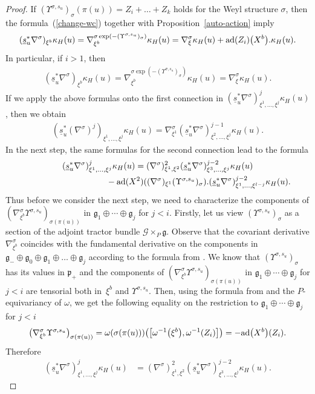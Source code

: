 \documentclass[10pt,a4paper]{amsart}
\newcommand{\om}{\omega}
\newcommand{\ka}{\kappa}
\newcommand{\si}{\sigma}
\newcommand{\un}{\underline}
\newcommand{\ba}{\mathcal{G}}
\newcommand{\fg}{\mathfrak g}
\newcommand{\fp}{\mathfrak p}
\newcommand{\na}{\nabla}
\newcommand{\U}{\Upsilon}
\newcommand{\ad}{{\rm ad}}
\numberwithin{equation}{section}
\begin{document}
\begin{proof}
If $(\U^{\si,s_u})_\si(\pi(u))=Z_i+\dots+Z_k$ holds for the Weyl structure $\si$, then the formula~(\ref{change-wc}) together with Proposition~\ref{auto-action} imply
\begin{gather*}(\un s_u^*\na^\si)_{\xi^b}\ka_H(u)=\na^{\si \exp(-(\U^{\si,s_u})_\si)}_{\xi^b}\ka_H(u)=\na^\si_\xi \ka_H(u)+\ad(Z_i)\big(X^{b}\big).\ka_H(u).\end{gather*}
In particular, if $i>1$, then
\begin{gather*}(\un s_u^*\na^\si)_{\xi^b}\ka_H(u)=\na^{\si \exp(-(\U^{\si,s_u})_\si)}_{\xi^b}\ka_H(u)=\na^\si_\xi \ka_H(u).\end{gather*}
If we apply the above formulas onto the f\/irst connection in $(\un s_u^*\nabla^\si)^j_{\xi^1,\dots,\xi^j} \ka_H(u)$, then we obtain
\begin{gather*}
(\un s_u^*(\nabla^\si)^j)_{\xi^1,\dots,\xi^j} \ka_H(u) =\na^\si_{\xi^1}(\un s_u^*\nabla^\si)^{j-1}_{\xi^2,\dots,\xi^{j}} \ka_H(u).
\end{gather*}
In the next step, the same formulas for the second connection lead to the formula
\begin{gather*}
(\un s_u^*\nabla^\si)^j_{\xi^1,\dots,\xi^j} \ka_H(u) =(\na^\si)^2_{\xi^1,\xi^2}(\un s_u^*\nabla^\si)^{j-2}_{\xi^3,\dots,\xi^{j}} \ka_H(u)\\
\hphantom{(\un s_u^*\nabla^\si)^j_{\xi^1,\dots,\xi^j} \ka_H(u) =}{}
-\ad(X^{2})((\nabla^\si)_{\xi^1}(\U^{\si,s_u})_\si).(\un s_u^*\nabla^\si)^{j-2}_{\xi^1,\dots,\xi^{l-j}}\ka_H(u).
\end{gather*}
Thus before we consider the next step, we need to characterize the components of $(\na^\si_{\xi^b}\! \U^{\si,s_u}\!)_{\si(\pi(u))\!}\!$ in $\fg_1\oplus \cdots \oplus \fg_{j}$ for $j<i$. Firstly, let us view $(\U^{\si,s_u})_\si$ as a section of the adjoint tractor bundle $\ba\times_P \fg$. Observe that the covariant derivative $\na^\si_{\xi^b}$ coincides with the fundamental derivative on the components in $\fg_-\oplus \fg_0 \oplus \fg_1\oplus \dots \oplus \fg_j$ according to the formula from \cite[Proposition~5.1.10]{parabook}. We know that $(\U^{\si,s_u})_\si$ has its values in $\fp_+$ and the components of $(\na^\si_{\xi^b} \U^{\si,s_u})_{\si(\pi(u))}$ in $\fg_1\oplus \cdots \oplus \fg_{j}$ for $j<i$ are tensorial both in~$\xi^b$ and $\U^{\si,s_u}$. Then, using the formula from \cite[Corollary~1.5.8]{parabook} and the $P$-equivariancy of $\om$, we get the following equality on the restriction to $\fg_1\oplus \cdots \oplus \fg_j$ for $j<i$
\begin{gather*}
\big(\na^\si_{\xi^b} \U^{\si,s_u}\big)_{\si(\pi(u))} =\om(\si(\pi(u)))\big(\big[\om^{-1}\big(\xi^b\big),\om^{-1}(Z_i)\big]\big)=-\ad\big(X^b\big)(Z_i).
\end{gather*}
Therefore
\begin{align*}
(\un s_u^*\nabla^\si)^j_{\xi^1,\dots,\xi^j} \ka_H(u)&=(\na^\si)^2_{\xi^1,\xi^2}(\un s_u^*\nabla^\si)^{j-2}_{\xi^3,\dots,\xi^{j}} \ka_H(u).
\end{align*}


\end{proof}
\end{document}
